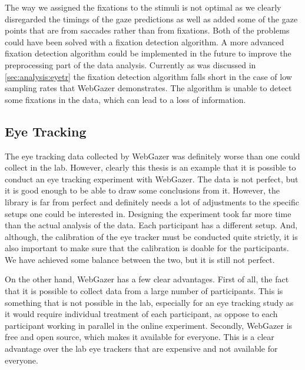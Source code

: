 The way we assigned the fixations to the stimuli is not optimal as we clearly disregarded the timings of the gaze predictions as well as added some of the gaze points that are from saccades rather than from fixations. Both of the problems could have been solved with a fixation detection algorithm. A more advanced fixation detection algorithm could be implemented in the future to improve the preprocessing part of the data analysis. Currently as was discussed in \autoref{sec:analysis:eyetr} the fixation detection algorithm falls short in the case of low sampling rates that WebGazer demonstrates. The algorithm is unable to detect some fixations in the data, which can lead to a loss of information.

\subsection{Eye Tracking}
\label{sec:general-discussion:eye-tracking}
The eye tracking data collected by WebGazer was definitely worse than one could collect in the lab. However, clearly this thesis is an example that it is possible to conduct an eye tracking experiment with WebGazer. The data is not perfect, but it is good enough to be able to draw some conclusions from it. However, the library is far from perfect and definitely needs a lot of adjustments to the specific setups one could be interested in. Designing the experiment took far more time than the actual analysis of the data. Each participant has a different setup. And, although, the calibration of the eye tracker must be conducted quite strictly, it is also important to make sure that the calibration is doable for the participants. We have achieved some balance between the two, but it is still not perfect. 

On the other hand, WebGazer has a few clear advantages. First of all, the fact that it is possible to collect data from a large number of participants. This is something that is not possible in the lab, especially for an eye tracking study as it would require individual treatment of each participant, as oppose to each participant working in parallel in the online experiment. Secondly, WebGazer is free and open source, which makes it available for everyone. This is a clear advantage over the lab eye trackers that are expensive and not available for everyone. 